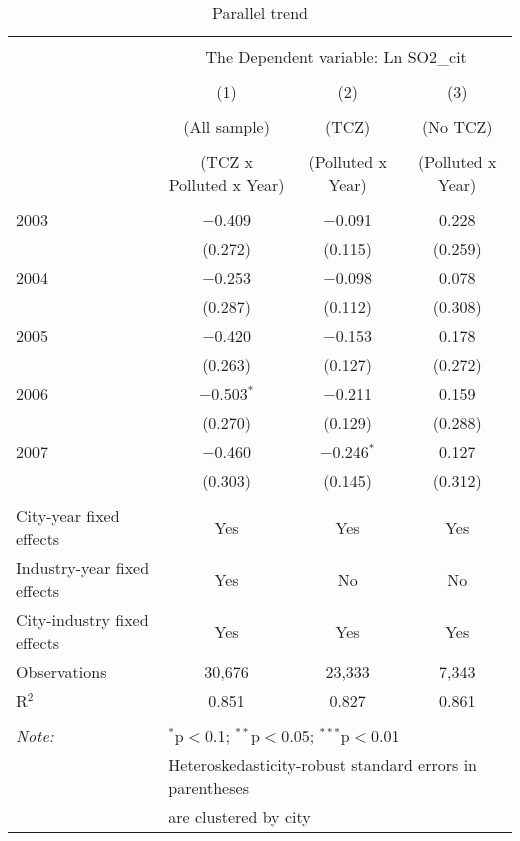 \documentclass[12pt]{article}
\begin{document}
\begin{table}[!htbp] \centering 
  \caption{Parallel trend} 
  \begin{adjustbox}{width=\textwidth, totalheight=\baselineskip,keepaspectratio}
  \label{} 
\begin{tabular}{@{\extracolsep{5pt}}lccc} 
\\[-1.8ex]\hline 
\hline \\[-1.8ex] 
 & \multicolumn{3}{c}{The Dependent variable: Ln SO2_{cit}} \\ 
\cline{2-4} 
\\[-1.8ex] & (1) & (2) & (3)\\ 
\\[-1.8ex] & (All sample) & (TCZ) & (No TCZ)\\ 
\\[-1.8ex] & (TCZ x Polluted x Year) & (Polluted x Year) & (Polluted x Year)\\ 
\hline \\[-1.8ex] 
  2003 & $-$0.409 & $-$0.091 & 0.228 \\ 
  & (0.272) & (0.115) & (0.259) \\ 
  2004 & $-$0.253 & $-$0.098 & 0.078 \\ 
  & (0.287) & (0.112) & (0.308) \\ 
  2005 & $-$0.420 & $-$0.153 & 0.178 \\ 
  & (0.263) & (0.127) & (0.272) \\ 
  2006 & $-$0.503$^{*}$ & $-$0.211 & 0.159 \\ 
  & (0.270) & (0.129) & (0.288) \\ 
  2007 & $-$0.460 & $-$0.246$^{*}$ & 0.127 \\ 
  & (0.303) & (0.145) & (0.312) \\ 
 \hline \\[-1.8ex] 
City-year fixed effects & Yes & Yes & Yes \\ 
Industry-year fixed effects & Yes & No & No \\ 
City-industry fixed effects & Yes & Yes & Yes \\ 
Observations & 30,676 & 23,333 & 7,343 \\ 
R$^{2}$ & 0.851 & 0.827 & 0.861 \\ 
\hline 
\hline \\[-1.8ex] 
\textit{Note:}  & \multicolumn{3}{l}{$^{*}$p$<$0.1; $^{**}$p$<$0.05; $^{***}$p$<$0.01} \\ 
 & \multicolumn{3}{l}{Heteroskedasticity-robust standard errors in parentheses} \\ 
 & \multicolumn{3}{l}{are clustered by city} \\ 
\end{tabular} 
\end{adjustbox}
\end{table} 
\end{document}
